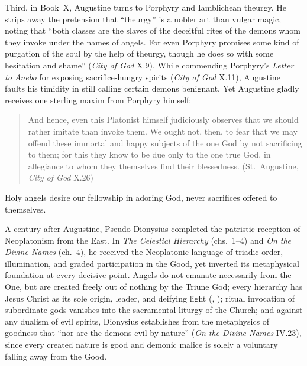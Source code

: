 Third, in Book~X, Augustine turns to Porphyry and Iamblichean theurgy. He strips away the pretension that ``theurgy'' is a nobler art than vulgar magic, noting that ``both classes are the slaves of the deceitful rites of the demons whom they invoke under the names of angels. For even Porphyry promises some kind of purgation of the soul by the help of theurgy, though he does so with some hesitation and shame'' (\emph{City of God} X.9). While commending Porphyry's \emph{Letter to Anebo} for exposing sacrifice-hungry spirits (\emph{City of God} X.11), Augustine faults his timidity in still calling certain demons benignant. Yet Augustine gladly receives one sterling maxim from Porphyry himself:
\begin{quotation}
And hence, even this Platonist himself judiciously observes that we should rather imitate than invoke them. We ought not, then, to fear that we may offend these immortal and happy subjects of the one God by not sacrificing to them; for this they know to be due only to the one true God, in allegiance to whom they themselves find their blessedness. (St.~Augustine, \emph{City of God} X.26)
\end{quotation}
Holy angels desire our fellowship in adoring God, never sacrifices offered to themselves.

A century after Augustine, Pseudo-Dionysius completed the patristic reception of Neoplatonism from the East. In \emph{The Celestial Hierarchy} (chs.~1--4) and \emph{On the Divine Names} (ch.~4), he received the Neoplatonic language of triadic order, illumination, and graded participation in the Good, yet inverted its metaphysical foundation at every decisive point. Angels do not emanate necessarily from the One, but are created freely out of nothing by the Triune God; every hierarchy has Jesus Christ as its sole origin, leader, and deifying light (, ); ritual invocation of subordinate gods vanishes into the sacramental liturgy of the Church; and against any dualism of evil spirits, Dionysius establishes from the metaphysics of goodness that ``nor are the demons evil by nature'' (\emph{On the Divine Names} IV.23), since every created nature is good and demonic malice is solely a voluntary falling away from the Good.
